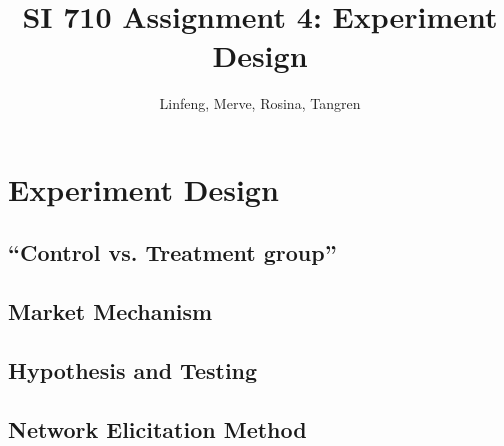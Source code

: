 \documentclass{article}
\title{SI 710 Assignment 4: Experiment Design}
\author{Linfeng, Merve, Rosina, Tangren}
\date{}
\begin{document}
\maketitle
%

\section{Experiment Design}

\subsection{``Control vs. Treatment group''}


\subsection{Market Mechanism}


\subsection{Hypothesis and Testing}

\subsection{Network Elicitation Method}





\end{document}
